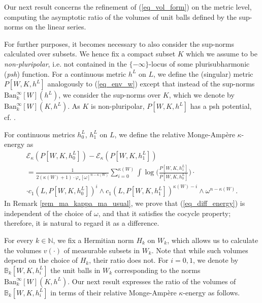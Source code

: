 \documentclass[12pt]{article}
\numberwithin{equation}{section}
\theoremstyle{theorem}
\theoremstyle{definition}
\theoremstyle{remark}
\newcommand{\vol}{v}
\newcommand{\nat}{\mathbb{N}}
\begin{document}
	\par 	
	Our next result concerns the refinement of (\ref{eq_vol_form}) on the metric level, computing the asymptotic ratio of the volumes of unit balls defined by the sup-norms on the linear series.
	\par
	For further purposes, it becomes necessary to also consider the sup-norms calculated over subsets.
	We hence fix a compact subset $K$ which we assume to be \textit{non-pluripolar}, i.e. not contained in the $\{-\infty\}$-locus of some plurisubharmonic (\textit{psh}) function.
	For a continuous metric $h^L$ on $L$, we define the (singular) metric $P[W, K, h^L]$ analogously to (\ref{eq_env_w}) except that instead of the sup-norms ${\textrm{Ban}}_k^{\infty}[W](h^L)$, we consider the sup-norms over $K$, which we denote by ${\textrm{Ban}}_k^{\infty}[W](K, h^L)$.
	As $K$ is non-pluripolar, $P[W, K, h^L]$ has a psh potential, cf. \cite[Theorem 9.17]{GuedjZeriahBook}.
	\par 
	For continuous metrics $h^L_0$, $h^L_1$ on $L$, we define the relative Monge-Ampère $\kappa$-energy as
	\begin{multline}\label{eq_diff_energy}
		\mathscr{E}_{\kappa}(P[W, K, h^L_0]) - \mathscr{E}_{\kappa}(P[W, K, h^L_1])
		\\
		=
		\frac{1}{2(\kappa(W) + 1) \cdot \varphi_{*} [\omega]^{n - \kappa(W)}}
		\sum_{i = 0}^{\kappa(W)} \int \log\Big( \frac{P[W, K, h^L_1]}{P[W, K, h^L_0]} \Big)
		\cdot
		\\
		 \cdot c_1(L, P[W, K, h^L_0])^i \wedge c_1(L, P[W, K, h^L_1])^{\kappa(W) - i} \wedge \omega^{n - \kappa(W)}.
	\end{multline}
	In Remark \ref{rem_ma_kappa_ma_usual}, we prove that (\ref{eq_diff_energy}) is independent of the choice of $\omega$, and that it satisfies the cocycle property; therefore, it is natural to regard it as a difference.
	\par 
	For every $k \in \nat$, we fix a Hermitian norm $H_k$ on $W_k$, which allows us to calculate the volumes $\vol(\cdot)$ of measurable subsets in $W_k$. 
	Note that while such volumes depend on the choice of $H_k$, their ratio does not.
	For $i = 0, 1$, we denote by $\mathbb{B}_k[W, K, h^L_i]$ the unit balls in $W_k$ corresponding to the norms ${\textrm{Ban}}_k^{\infty}[W](K, h^L)$.
	Our next result expresses the ratio of the volumes of $\mathbb{B}_k[W, K, h^L_i]$ in terms of their relative Monge-Ampère $\kappa$-energy as follows.
\end{document}
